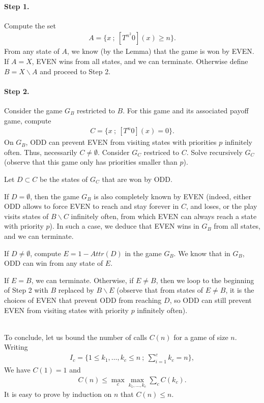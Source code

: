 \documentclass{article}
\begin{document}
\paragraph{Step 1.}
Compute the set
\begin{align}
  A = \{ x ~;~ [T^{n^2} 0](x) \ge n \}.
\end{align}
From any state of $A$, we know (by the Lemma) that the game is won by EVEN. If $A=X$, EVEN wins from all states, and we can terminate. Otherwise define $B=X \backslash A$ and proceed to Step 2.

\paragraph{Step 2.}
Consider the game $G_B$ restricted to $B$. For this game and its associated payoff game, compute
\begin{align}
C = \{ x ~;~ [T^n0](x) = 0 \}.
\end{align}
On $G_B$, ODD can prevent EVEN from  visiting states with priorities $p$ infinitely often. Thus, necessarily $C \neq \emptyset$. Consider $G_C$ restriced to $C$. Solve recursively $G_C$ (observe that this game only has priorities smaller than $p$).

Let $D \subset C$ be the states of $G_C$ that are won by ODD.

If $D = \emptyset$, then the game $G_B$ is also completely known by EVEN (indeed, either ODD allows to force EVEN to reach and stay forever in $C$, and loses, or the play visits states of $B \backslash C$ infinitely often, from which EVEN can always reach a state with priority $p$). In such a case, we deduce that EVEN wins in $G_B$ from all states, and we can terminate. 

If $D \neq \emptyset$, compute $E=1-Attr(D)$ in the game $G_B$. We know that in $G_B$, ODD can win from any state of $E$.

If $E=B$, we can terminate. Otherwise, if $E \neq B$, then we loop to the beginning of Step 2 with $B$ replaced by $B \backslash E$ (observe that from states of $E \neq B$, it is the choices of EVEN that prevent ODD from reaching $D$, so ODD can still prevent EVEN from visiting states with priority $p$ infinitely often). 

~\\

To conclude, let us bound the number of calls $C(n)$ for a game of size $n$. Writing
\begin{align}
  I_c = \{ 1 \le k_1, \dots, k_c \le n ~;~ \sum_{i=1}^c k_c=n \},
\end{align}
We have $C(1)=1$ and
\begin{align}
  C(n) \le \max_c \max_{k_1,\dots,k_c} \sum_c C(k_c).
\end{align}
It is easy to prove by induction on $n$ that $C(n)\le n$.





 
\end{document}
